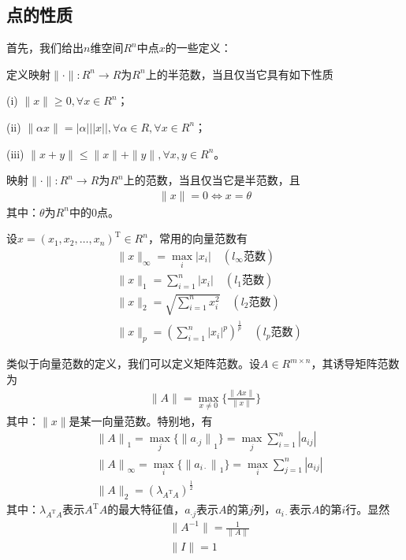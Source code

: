     \subsection{点的性质}
        \par
        首先，我们给出$n$维空间$R^n$中点$x$的一些定义：
        \begin{definition}[半范数]
        定义映射$\|\cdot \|:R^n \rightarrow R$为$R^n$上的半范数，当且仅当它具有如下性质
        \par
        (i) $\| x \| \ge 0,\forall x \in {R^n}$；
        \par
        (ii) $\| \alpha x \| =|\alpha| ||x||, \forall\alpha \in R,\forall x \in {R^n}$；
        \par
        (iii) $\| x+y \|  \le \| x \| + \| y\|, \forall x,y \in {R^n}$。
        \end{definition}
        \begin{definition}[范数]
        映射$\|\cdot \|:R^n \rightarrow R$为$R^n$上的范数，当且仅当它是半范数，且
        \begin{align*}
          \|x \| = 0 \Leftrightarrow x=\theta
        \end{align*}
        其中：$\theta$为$R^n$中的$0$点。
        \end{definition}
        \par
        设$x=(x_1,x_2,\dots,x_n)^\mathrm{T} \in R^n$，常用的向量范数有
        \begin{align*}
        & \| x \|_\infty  = \mathop {\max }\limits_i |x_i| \quad (l_\infty \text{范数})\\
        & \| x \|_1 = \sum \limits_{i=1}^n |x_i| \quad (l_1 \text{范数})\\
        & \| x \|_2 = \sqrt{\sum \limits_{i=1}^n x_i^2} \quad (l_2 \text{范数})\\
        & \| x \|_p = \left( {\sum \limits_{i=1}^n} |x_i|^p \right) ^{\frac 1 {p}}  \quad (l_p \text{范数})
        \end{align*}
        \par
        类似于向量范数的定义，我们可以定义矩阵范数。设$A \in R^{m\times n}$，其诱导矩阵范数为
        \begin{align*}
        \|A\| = \mathop {\max }\limits_{x \ne 0} \bigg \{\frac {\|Ax\|}{\|x\|} \bigg \}
        \end{align*}
        其中：$\|x\|$是某一向量范数。特别地，有
        \begin{align*}
        & {\|A\|}_1= \mathop {\max} \limits_j\{{\|a_{\cdot j}\|}_1\} = \mathop {\max} \limits_j \sum \limits_{i = 1}^n |a_{ij}|\\
        & {\|A\|}_{\infty} = \mathop {\max} \limits_i \{{\|a_{i \cdot}\|}_1\} = \mathop {\max} \limits_i \sum\limits_{j = 1}^n |a_{ij}|\\
        & {\|A\|_2} = (\lambda_{ A^\mathrm{T}A})^{\frac 12}
        \end{align*}
        其中：$\lambda_{ A^\mathrm{T}A}$表示$A^\mathrm{T}A$的最大特征值，$a_{\cdot j}$表示$A$的第$j$列，$a_{i \cdot}$表示$A$的第$i$行。显然
        \begin{align*}
        & \|A^{-1}\| = {\frac 1{\|A\|}}\\
        & \|I\| = 1
        \end{align*}
